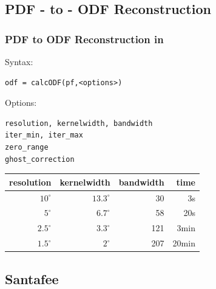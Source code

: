 \begin{frame}[fragile]
\begin{columns}
\begin{column}{3.1cm}
{      }
    \end{column}

  \end{columns}

\end{frame}

\subsection*{PDF - to - ODF Reconstruction}


\begin{frame}[fragile]
  \frametitle{PDF to ODF Reconstruction in \MTEX}

  Syntax:
  \begin{alertenv}
\begin{lstlisting}
odf = calcODF(pf,<options>)
\end{lstlisting}
  \end{alertenv}

Options:
\begin{lstlisting}
resolution, kernelwidth, bandwidth
iter_min, iter_max
zero_range
ghost_correction
\end{lstlisting}

\pause

\begin{table}[H]
  \centering
  \begin{tabular}{r r r r}
    \toprule
    resolution & kernelwidth  & bandwidth & time \\
    \midrule
    $10^\circ$  & $13.3^\circ$ & 30  & 3s  \\
    $5^\circ$   & $6.7^\circ$  & 58  & 20s \\
    $2.5^\circ$ & $3.3^\circ$  & 121 & 3min\\
    $1.5^\circ$ & $2^\circ$    & 207 & 20min\\
    \bottomrule
  \end{tabular}
\end{table}

\end{frame}


\subsection*{Santafee}

